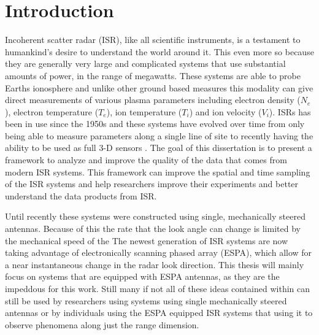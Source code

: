 \chapter{Introduction}
\label{chapter:body}
\thispagestyle{myheadings}
\setcounter{tocdepth}{1}
\graphicspath{{1_Intro/Figures/}}

Incoherent scatter radar (ISR), like all scientific instruments, is a testament to humankind's desire to understand the world around it. This even more so because they are generally very large and complicated systems that use substantial amounts of power, in the range of megawatts. These systems are able to probe Earths ionosphere and unlike other ground based measures this modality can give direct measurements of various plasma parameters including electron density ($N_e$), electron temperature ($T_e$), ion temperature ($T_i$) and ion velocity ($V_i$). ISRs has been in use since the 1950s \cite{gordon58} and these systems have evolved over time from only being able to measure parameters along a single line of site to recently having the ability to be used as full 3-D sensors \cite{Semeter2009738,Nicolls:2007ie}. The goal of this dissertation is to present a framework to analyze and improve the quality of the data that comes from modern ISR systems. This framework can  improve the spatial and time sampling of the ISR systems and help researchers improve their experiments and better understand the data products from ISR.

Until recently these systems were constructed using single, mechanically steered antennas. Because of this the rate that the look angle can change is limited by the mechanical speed of the  The newest generation of ISR systems are now taking advantage of electronically scanning phased array (ESPA), which allow for a near instantaneous change in the radar look direction. This thesis will mainly focus on systems that are equipped with ESPA antennas, as they are the impeddous for this work. Still many if not all of these ideas contained within can still be used by researchers using systems using single mechanically steered antennas or by individuals using the ESPA equipped ISR systems that using it to observe phenomena along just the range dimension.

 
